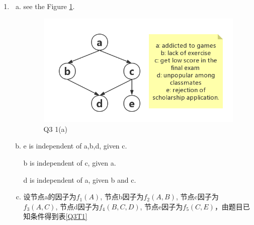 \documentclass[a4paper, 11pt]{article}
\begin{document}
\begin{enumerate}
  \item
    \begin{enumerate}[(a)]
      \item see the Figure \ref{Q3fig1}.
      \begin{figure}[htbp]
        \centering
        \includegraphics[width=15cm]{pic/1}
        \caption{Q3 1(a)}
        \label{Q3fig1}
      \end{figure}
      \item
      e is independent of a,b,d, given c.

      b is independent of c, given a.

      d is independent of a, given b and c.

      \item
      设节点a的因子为$f_{1}(A)$, 节点b因子为$f_{2}(A,B)$, 节点c因子为
      $f_{3}(A,C)$, 节点d因子为$f_{4}(B,C,D)$, 节点e因子为$f_{5}(C,E)$，由题目已知条件得到表\ref{Q3T1}\\


\end{enumerate}
\end{enumerate}
\end{document}
